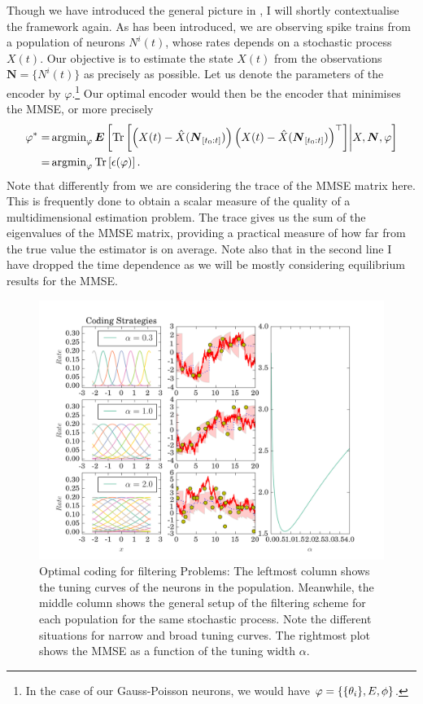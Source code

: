 Though we have introduced the general picture in , I will shortly contextualise the framework again. As has been introduced, we are observing spike
trains from a population of neurons $N^i(t)$, whose rates depends on a stochastic process $X(t)$. Our objective is to estimate the state $X(t)$ from the observations
$\boldsymbol{N} = \{N^i(t)\}$ as precisely as possible. Let us denote the parameters of the encoder by $\varphi$.\footnote{In the case of our Gauss-Poisson neurons, we 
would have
$\varphi = \{\{\theta_i\}, E, \phi\}$.} Our optimal encoder would then be the encoder that minimises the MMSE, or more precisely
\begin{align*}
\varphi^* =& \operatorname{argmin}_\varphi \boldsymbol{E}\left[\operatorname{Tr}\left[\left(X(t) - \hat{X}(\boldsymbol{N}_{[t_0:t]})\right)\left(X(t) - \hat{X}(\boldsymbol{N}_{[t_0:t]})\right)^\top \right]\middle| X, \boldsymbol{N},\varphi\right]\\
=& \operatorname{argmin}_\varphi \operatorname{Tr}\left[\epsilon(\varphi)\right].
\end{align*}
Note that differently from  we are considering the trace of the MMSE matrix here. This is frequently done to obtain a scalar measure of the quality of a
multidimensional estimation problem. The trace gives us the sum of the eigenvalues of the MMSE matrix, providing a practical measure of how far from the true value
the estimator is on average. Note also that in the second line I have dropped the time dependence as we will be mostly considering equilibrium results for the MMSE.
\par

\begin{figure}
\label{fig:filtering_expl}
\includegraphics[width=\columnwidth]{figures/figure_5_1.png}
\caption{Optimal coding for filtering Problems: The leftmost column shows the tuning curves of the neurons in the population. Meanwhile, the middle column
shows the general setup of the filtering scheme for each population for the same stochastic process. Note the different situations for narrow and broad tuning curves.
The rightmost plot shows the MMSE as a function of the tuning width $\alpha$.}
\end{figure}

